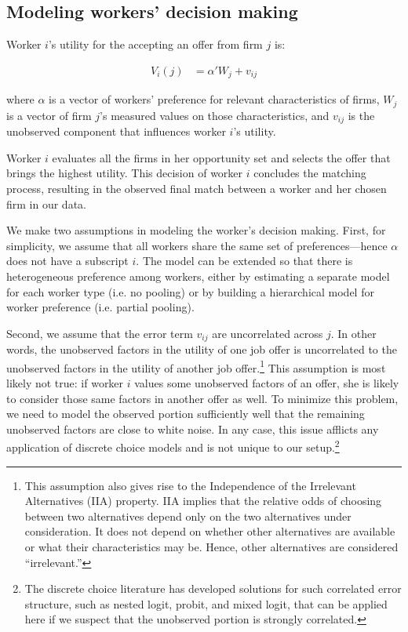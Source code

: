 \subsection{Modeling workers' decision making}

Worker $i$'s utility for the accepting an offer from firm $j$ is:

\begin{align}
  V_i(j) &= \alpha' W_{j} + v_{ij}
\end{align}

where $\alpha$ is a vector of workers' preference for relevant characteristics
of firms, $W_j$ is a vector of firm $j$'s measured values on those
characteristics, and $v_{ij}$ is the unobserved component that influences worker
$i$'s utility.

Worker $i$ evaluates all the firms in her opportunity set and selects the offer
that brings the highest utility. This decision of worker $i$ concludes the
matching process, resulting in the observed final match between a worker and her
chosen firm in our data.

We make two assumptions in modeling the worker's decision making. First, for
simplicity, we assume that all workers share the same set of preferences---hence
$\alpha$ does not have a subscript $i$. The model can be extended so that there
is heterogeneous preference among workers, either by estimating a separate model
for each worker type (i.e. no pooling) or by building a hierarchical model for
worker preference (i.e. partial pooling).

Second, we assume that the error term $v_{ij}$ are uncorrelated across $j$. In
other words, the unobserved factors in the utility of one job offer is
uncorrelated to the unobserved factors in the utility of another job
offer.\footnote{This assumption also gives rise to the Independence of the
  Irrelevant Alternatives (IIA) property. IIA implies that the relative odds of
  choosing between two alternatives depend only on the two alternatives under
  consideration. It does not depend on whether other alternatives are available
  or what their characteristics may be. Hence, other alternatives are considered
  ``irrelevant.''} This assumption is most likely not true: if worker $i$ values
some unobserved factors of an offer, she is likely to consider those same
factors in another offer as well. To minimize this problem, we need to model the
observed portion sufficiently well that the remaining unobserved factors are
close to white noise. In any case, this issue afflicts any application of
discrete choice models and is not unique to our setup.\footnote{The discrete
  choice literature has developed solutions for such correlated error structure,
  such as nested logit, probit, and mixed logit, that can be applied here if we
  suspect that the unobserved portion is strongly correlated.}

